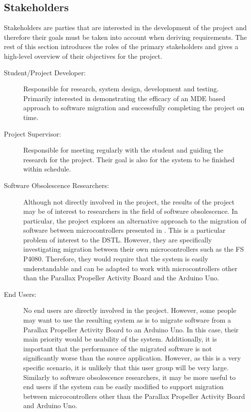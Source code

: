 \documentclass{UoYCSproject}
\begin{document}
\subsection{Stakeholders} \label{stakeholders}
Stakeholders are parties that are interested in the development of the project and therefore their goals must be taken into account when deriving requirements. The rest of this section introduces the roles of the primary stakeholders and gives a high-level overview of their objectives for the project.

\begin{description}
\item[Student/Project Developer:] Responsible for research, system design, development and testing. Primarily interested in demonstrating the efficacy of an MDE based approach to software migration and successfully completing the project on time.

\item[Project Supervisor:] Responsible for meeting regularly with the student and guiding the research for the project. Their goal is also for the system to be finished within schedule.

\item[Software Obsolescence Researchers:] Although not directly involved in the project, the results of the project may be of interest to researchers in the field of software obsolescence. In particular, the project explores an alternative approach to the migration of software between microcontrollers presented in \parencite{gerasimou2017technical}. This is a particular problem of interest to the DSTL. However, they are specifically investigating migration between their own microcontrollers such as the FS P4080. Therefore, they would require that the system is easily understandable and can be adapted to work with microcontrollers other than the Parallax Propeller Activity Board and the Arduino Uno.

\item[End Users:] No end users are directly involved in the project. However, some people may want to use the resulting system as is to migrate software from a Parallax Propeller Activity Board to an Arduino Uno. In this case, their main priority would be usability of the system. Additionally, it is important that the performance of the migrated software is not significantly worse than the source application. However, as this is a very specific scenario, it is unlikely that this user group will be very large. Similarly to software obsolescence researchers, it may be more useful to end users if the system can be easily modified to support migration between microcontrollers other than the Parallax Propeller Activity Board and Arduino Uno.
\end{description}
\end{document}
